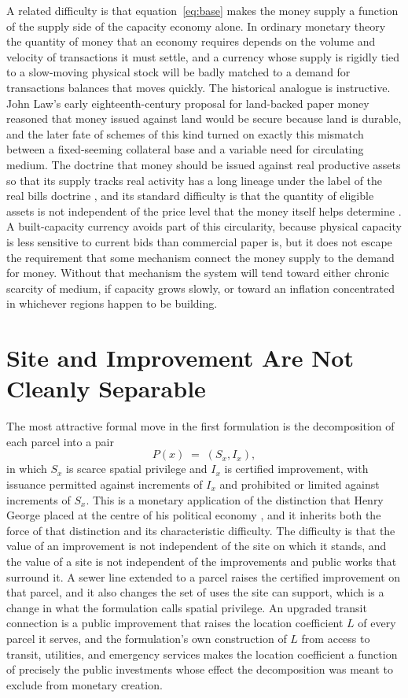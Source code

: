 \documentclass[11pt]{article}
\theoremstyle{definition}
\begin{document}
A related difficulty is that equation~\eqref{eq:base} makes the money supply a function of the supply side of the capacity economy alone. In ordinary monetary theory the quantity of money that an economy requires depends on the volume and velocity of transactions it must settle, and a currency whose supply is rigidly tied to a slow-moving physical stock will be badly matched to a demand for transactions balances that moves quickly. The historical analogue is instructive. John Law's early eighteenth-century proposal for land-backed paper money \cite{law1705} reasoned that money issued against land would be secure because land is durable, and the later fate of schemes of this kind turned on exactly this mismatch between a fixed-seeming collateral base and a variable need for circulating medium. The doctrine that money should be issued against real productive assets so that its supply tracks real activity has a long lineage under the label of the real bills doctrine \cite{mints1945}, and its standard difficulty is that the quantity of eligible assets is not independent of the price level that the money itself helps determine \cite{sargent1982}. A built-capacity currency avoids part of this circularity, because physical capacity is less sensitive to current bids than commercial paper is, but it does not escape the requirement that some mechanism connect the money supply to the demand for money. Without that mechanism the system will tend toward either chronic scarcity of medium, if capacity grows slowly, or toward an inflation concentrated in whichever regions happen to be building.

\section{Site and Improvement Are Not Cleanly Separable}

The most attractive formal move in the first formulation is the decomposition of each parcel into a pair
\begin{equation}
P(x) \;=\; (S_x, I_x),
\label{eq:pair}
\end{equation}
in which $S_x$ is scarce spatial privilege and $I_x$ is certified improvement, with issuance permitted against increments of $I_x$ and prohibited or limited against increments of $S_x$. This is a monetary application of the distinction that Henry George placed at the centre of his political economy \cite{george1879}, and it inherits both the force of that distinction and its characteristic difficulty. The difficulty is that the value of an improvement is not independent of the site on which it stands, and the value of a site is not independent of the improvements and public works that surround it. A sewer line extended to a parcel raises the certified improvement on that parcel, and it also changes the set of uses the site can support, which is a change in what the formulation calls spatial privilege. An upgraded transit connection is a public improvement that raises the location coefficient $L$ of every parcel it serves, and the formulation's own construction of $L$ from access to transit, utilities, and emergency services makes the location coefficient a function of precisely the public investments whose effect the decomposition was meant to exclude from monetary creation.
\end{document}
